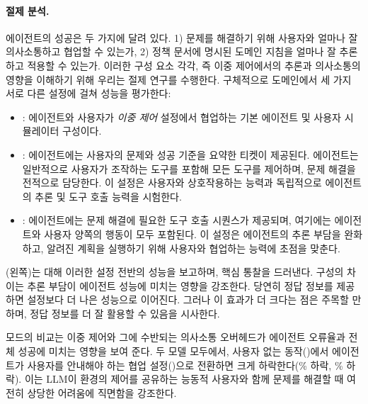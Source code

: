 \paragraph{절제 분석.}

 에이전트의 성공은 두 가지에 달려 있다. 1) 문제를 해결하기 위해 사용자와 얼마나 잘 의사소통하고 협업할 수 있는가, 2) 정책 문서에 명시된 도메인 지침을 얼마나 잘 추론하고 적용할 수 있는가. 이러한 구성 요소 각각, 즉 이중 제어에서의 추론과 의사소통의 영향을 이해하기 위해 우리는 절제 연구를 수행한다. 구체적으로 \telecom 도메인에서 세 가지 서로 다른 설정에 걸쳐 성능을 평가한다:

\begin{itemize}
    \setlength\itemsep{0em}
    \item \textbf{\basemode}: 에이전트와 사용자가 \textit{이중 제어} 설정에서 협업하는 기본 에이전트 및 사용자 시뮬레이터 구성이다.
    \item \textbf{\solomode}: 에이전트에는 사용자의 문제와 성공 기준을 요약한 티켓이 제공된다. 에이전트는 일반적으로 사용자가 조작하는 도구를 포함해 모든 도구를 제어하며, 문제 해결을 전적으로 담당한다. 이 설정은 사용자와 상호작용하는 능력과 독립적으로 에이전트의 추론 및 도구 호출 능력을 시험한다.
    \item \textbf{\gtmode}: 에이전트에는 문제 해결에 필요한 도구 호출 시퀀스가 제공되며, 여기에는 에이전트와 사용자 양쪽의 행동이 모두 포함된다. 이 설정은 에이전트의 추론 부담을 완화하고, 알려진 계획을 실행하기 위해 사용자와 협업하는 능력에 초점을 맞춘다.
\end{itemize}


(왼쪽)는   대해 이러한 설정 전반의 성능을 보고하며, 핵심 통찰을 드러낸다. 
 \basemode 구성의 차이는 추론 부담이 에이전트 성능에 미치는 영향을 강조한다. 
당연히 정답 정보를 제공하면 \basemode 설정보다 더 나은 성능으로 이어진다. 그러나 이 효과가   더 크다는 점은 주목할 만하며,  정답 정보를 더 잘 활용할 수 있음을 시사한다.



 \basemode 모드의 비교는 이중 제어와 그에 수반되는 의사소통 오버헤드가 에이전트 오류율과 전체 성공에 미치는 영향을 보여 준다. 두 모델 모두에서, 사용자 없는 동작(\solomode)에서 에이전트가 사용자를 안내해야 하는 협업 설정(\basemode)으로 전환하면  크게 하락한다(\% 하락, \% 하락).
이는 LLM이 환경의 제어를 공유하는 능동적 사용자와 함께 문제를 해결할 때 여전히 상당한 어려움에 직면함을 강조한다.

